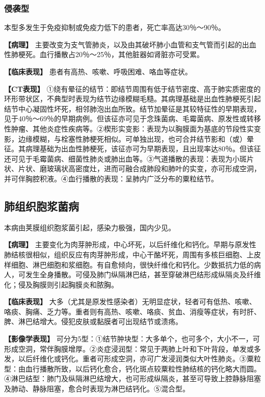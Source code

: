 \subsubsection{侵袭型}

本型多发生于免疫抑制或免疫力低下的患者，死亡率高达30％～90％。

\textbf{【病理】}
主要改变为支气管肺炎，以及由其破坏肺小血管和支气管而引起的出血性肺梗死。血行播散占20％～25％，其他脏器如肾脏亦可受累。

\textbf{【临床表现】} 患者有高热、咳嗽、呼吸困难、咯血等症状。

\textbf{【CT表现】}
①绕有晕征的结节：即结节周围有低于结节密度、高于肺实质密度的环形带状区，不典型时表现为结节边缘模糊毛糙。其病理基础是出血性肺梗死引起结节中心凝固性坏死，相邻肺泡出血所致。结节加晕征是其较特征性的早期表现，见于40％～69％的早期病例。但该征亦可见于念珠菌病、毛霉菌病、原发性或转移性肿瘤、其他炎症性疾病等。②楔形实变影：表现为以胸膜面为基底的节段性实变影，边缘模糊，与栓塞性肺梗死相似。可单独出现，也可合并结节影和（或）晕征。其病理基础为出血性肺梗死，该征亦可为早期表现，且出现率达80％。但该征还可见于毛霉菌病、细菌性肺炎或肺出血等。③气道播散的表现：表现为小斑片状、片状、磨玻璃状高密度灶，进而可融合成肺段和肺叶的实变，亦可形成空洞，并可伴胸腔积液。④血行播散的表现：呈肺内广泛分布的粟粒结节。

\subsection{肺组织胞浆菌病}

本病由荚膜组织胞浆菌引起，感染力极强，国内少见。

\textbf{【病理】}
主要变化为肉芽肿形成，中心坏死，以后纤维化和钙化。早期与原发性肺结核很相似，组织反应有肉芽肿形成，中心干酪坏死，周围有多核巨细胞、上皮样细胞、淋巴细胞和浆细胞。有自愈倾向，很快纤维化和钙化。少数抵抗力低的病人，可发生全身播散。可侵及肺门纵隔淋巴结，甚至穿破淋巴结形成纵隔炎及纤维化；侵及胸膜则引起胸膜炎和脓胸。

\textbf{【临床表现】}
大多（尤其是原发性感染者）无明显症状，轻者可有低热、咳嗽、咯痰、胸痛、乏力等。重者则有高热、咳嗽、咯痰、贫血、消瘦等症状，有时肝、脾、淋巴结增大。侵犯皮肤或黏膜者可出现结节或溃疡。

\textbf{【影像学表现】}
可分为5型：①结节肿块型：大多单个，也可多个，大小不一，可形成空洞，常伴胸膜增厚。②炎症浸润型：常见于两肺上叶和下叶背段，单发或多发，以后纤维化或钙化。重者可形成空洞，亦可广发浸润类似大叶性肺炎。③粟粒型：由血行播散所致，以后钙化愈合，钙化斑点较粟粒性肺结核的钙化略大而圆。④淋巴结型：肺门及纵隔淋巴结增大，也可形成纵隔炎，甚至可导致上腔静脉阻塞及肺动、静脉阻塞，愈合时表现为淋巴结钙化。⑤混合型。

